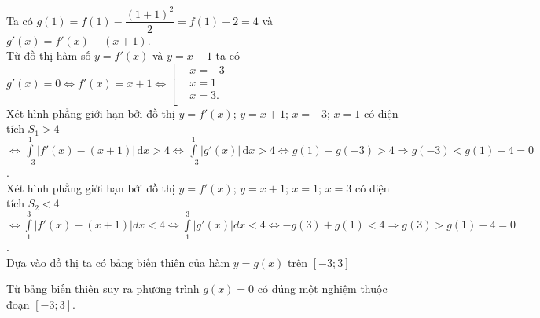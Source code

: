 \begin{ex}
{\begin{center}
		\end{center}
		Ta có $ g(1)=f(1)-\dfrac{(1+1)^2}{2}=f(1)-2=4$ và $g'(x)=f'(x)-(x+1)$.\\
		Từ đồ thị hàm số $ y=f'(x)$ và $ y=x+1$ ta có $g'(x)=0\Leftrightarrow f'(x)=x+1\Leftrightarrow \left[ \begin{aligned}
			& x=-3 \\
			& x=1 \\
			& x=3. \\
		\end{aligned} \right.$\\
		Xét hình phẳng giới hạn bởi đồ thị $ y=f'(x)$; $y=x+1$; $x=-3$; $x=1$ có diện tích $ S_1 >4$ $\Leftrightarrow \displaystyle\int\limits_{-3}^{1}\left| f'(x)-( x+1 ) \right|\mathrm{\,d}x>4\Leftrightarrow \displaystyle\int\limits_{-3}^{1}\left| g'(x) \right|\mathrm{\,d}x>4\Leftrightarrow  g(1)-g( -3 )>4\Rightarrow g( -3 )<g(1)-4=0$.\\
		Xét hình phẳng giới hạn bởi đồ thị $ y=f'(x)$; $y=x+1$; $x=1$; $x=3$ có diện tích $ S_2 <4$
		$\Leftrightarrow \displaystyle\int\limits_{1}^{3}\left| f'(x)-( x+1 ) \right|dx<4\Leftrightarrow \displaystyle\int\limits_{1}^{3}\left| g'(x) \right|dx<4\Leftrightarrow  -g( 3 )+g(1)<4\Rightarrow g( 3 )>g(1)-4=0$.\\
		Dựa vào đồ thị ta có bảng biến thiên của hàm $ y=g(x)$ trên $\left[ -3;3 \right]$
		\begin{center}
		\end{center}
		Từ bảng biến thiên suy ra phương trình $ g(x)=0$ có đúng một nghiệm thuộc đoạn $\left[ -3;3 \right]$.
	}
\end{ex}
